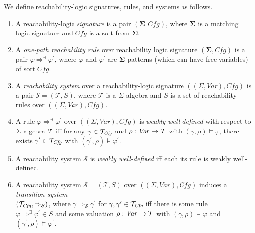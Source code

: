 \begin{definition}\label{def:basics}
We define reachability-logic signatures, rules, and systems as follows.
\begin{enumerate}
    \item A reachability-logic \emph{signature} is a pair $(\mathbf{\Sigma}, \mathit{Cfg})$,
          where $\mathbf{\Sigma}$ is a matching logic signature and $\mathit{Cfg}$ is a sort from $\mathbf{\Sigma}$.
          
    \item A \emph{one-path reachability rule} over reachability logic signature $(\mathbf{\Sigma}, \mathit{Cfg})$        is a pair $\varphi \Rightarrow^\exists \varphi^\prime$,
          where $\varphi$ and $\varphi^\prime$
          are $\mathbf{\Sigma}$-patterns (which can have free variables) of sort $\mathit{Cfg}$.
          
    \item A \emph{reachability system} over a reachability-logic signature $((\Sigma, \mathit{Var}), \mathit{Cfg})$
          is a pair $\mathcal{S} = (\mathcal{T}, S)$, where $\mathcal{T}$ is a $\Sigma$-algebra
          and $S$ is a set of reachability rules over $((\Sigma, \mathit{Var}), \mathit{Cfg})$.
          
    \item A rule $\varphi \Rightarrow^\exists \varphi^\prime$ over $((\Sigma, \mathit{Var}), \mathit{Cfg})$
          is \emph{weakly well-defined}
          with respect to $\Sigma$-algebra $\mathcal{T}$
          iff
          for any $\gamma \in \mathcal{T}_{\mathit{Cfg}}$ and $\rho : \mathit{Var} \to \mathcal{T}$
          with $(\gamma, \rho) \vDash \varphi$,
          there exists $\gamma^\prime \in \mathcal{T}_{\mathit{Cfg}}$ with $(\gamma^\prime , \rho) \vDash \varphi^\prime$.
          
    \item A reachability system $\mathcal{S}$ is \emph{weakly well-defined} iff each its rule is weakly     
          well-defined.
          
    \item A reachability system $\mathcal{S} = (\mathcal{T}, S)$ over $((\Sigma, \mathit{Var}), \mathit{Cfg})$ induces
          a \emph{transition system} \\
          $(\mathcal{T}_{\mathit{Cfg}} , \Rightarrow_{\mathcal{S}})$,
          where $\gamma \Rightarrow_{\mathcal{S}} \gamma^\prime$
          for $\gamma, \gamma^\prime \in \mathcal{T}_{\mathit{Cfg}}$
          iff there is some rule \\ $\varphi \Rightarrow^\exists \varphi^\prime \in S$
          and some valuation $\rho : \mathit{Var} \to \mathcal{T}$ with $(\gamma, \rho) \vDash \varphi$
          and $(\gamma^\prime , \rho) \vDash \varphi^\prime$.


\end{enumerate}
\end{definition}

